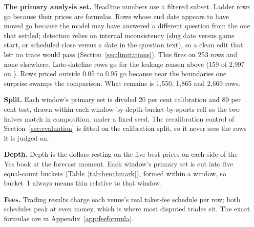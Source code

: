 \textbf{The primary analysis set.} Headline numbers use a filtered subset.
Ladder rows go because their prices are formulas. Rows whose end date appears to
have moved go because the model may have answered a different question from the
one that settled; detection relies on internal inconsistency (slug date versus
game start, or scheduled close versus a date in the question text), so a clean
edit that left no trace would pass (Section~\ref{sec:limitations}). This fires
on 253 \winB rows and none elsewhere. Late-dateline rows go for the leakage
reason above (159 of 2{,}997 on \winA). Rows priced outside 0.05 to 0.95 go
because near the boundaries one surprise swamps the comparison. What remains is
1{,}550, 1{,}865 and 2{,}669 rows.

\textbf{Split.} Each window's primary set is divided 20 per cent calibration and
80 per cent test, drawn within each window-by-depth-bucket-by-sports cell so the
two halves match in composition, under a fixed seed. The recalibration control of Section~\ref{sec:evaluation} is fitted on the
calibration split, so it never sees the rows it is judged on.

\textbf{Depth.} Depth is the dollars resting on the five best prices on each side
of the Yes book at the forecast moment. Each window's primary set is cut into
five equal-count buckets (Table~\ref{tab:benchmark}), formed within a window, so
bucket~1 always means thin relative to that window.

\textbf{Fees.} Trading results charge each venue's real taker-fee schedule per
row; both schedules peak at even money, which is where most disputed trades sit.
The exact formulas are in Appendix~\ref{app:feeformula}.

\begin{table}[!tbp]
\centering
\caption{The benchmark. \emph{Drawn} is every row sampled; \emph{in play} drops the 159
\winA late-dateline rows. The primary set drops ladders, 253 moved-end-date \winB rows, and
prices outside 0.05--0.95; headline numbers use its test split. Depth cuts are the four
boundaries between five equal-count buckets within each window.}
\label{tab:benchmark}

\end{table}
